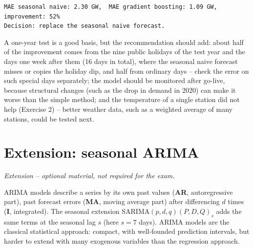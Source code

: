 \documentclass[
  letterpaper,
  DIV=11,
  numbers=noendperiod]{scrreprt}
\begin{document}
\begin{verbatim}
MAE seasonal naive: 2.30 GW,  MAE gradient boosting: 1.09 GW,  improvement: 52%
Decision: replace the seasonal naive forecast.
\end{verbatim}

A one-year test is a good basis, but the recommendation should add:
about half of the improvement comes from the nine public holidays of the
test year and the days one week after them (16 days in total), where the
seasonal naive forecast misses or copies the holiday dip, and half from
ordinary days -- check the error on such special days separately; the
model should be monitored after go-live, because structural changes
(such as the drop in demand in 2020) can make it worse than the simple
method; and the temperature of a single station did not help (Exercise
2) -- better weather data, such as a weighted average of many stations,
could be tested next.

\section{Extension: seasonal ARIMA}\label{extension-seasonal-arima}

\emph{Extension -- optional material, not required for the exam.}

ARIMA models describe a series by its own past values (\textbf{AR},
autoregressive part), past forecast errors (\textbf{MA}, moving average
part) after differencing \(d\) times (\textbf{I}, integrated). The
seasonal extension SARIMA\((p,d,q)(P,D,Q)_s\) adds the same terms at the
seasonal lag \(s\) (here \(s = 7\) days). ARIMA models are the classical
statistical approach: compact, with well-founded prediction intervals,
but harder to extend with many exogenous variables than the regression
approach.
\end{document}
